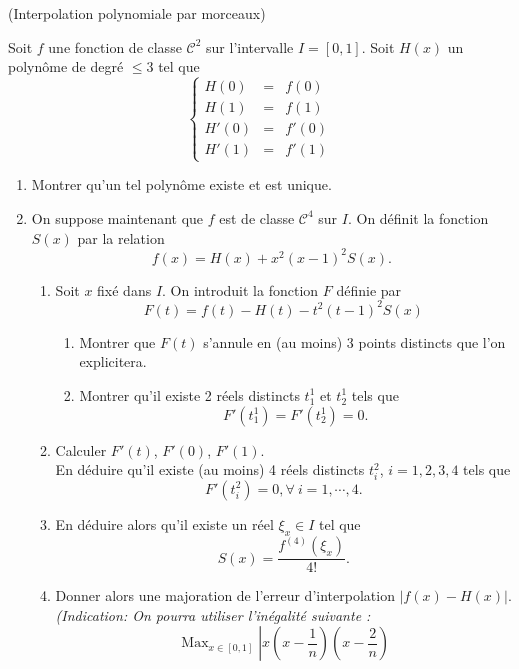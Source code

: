 \documentclass[a4paper,12pt,reqno]{amsart}
\begin{document}
\begin{exo} (Interpolation polynomiale par morceaux)

  Soit $f$ une fonction de classe ${\mathcal{C}}^2$ sur l'intervalle $I=[0,1]$. Soit $H(x)$ un polynôme de degré $\le 3$ tel que
  $$
    \left\{
      \begin{array}{lcl}
        H(0)  &=& f(0)\\
        H(1)  &=& f(1)\\
        H'(0) &=& f'(0)\\
        H'(1) &=& f'(1)
      \end{array}
    \right.
  $$
  \begin{enumerate}
    \item Montrer qu'un tel polynôme existe et est unique.
    \item On suppose maintenant que $f$ est de classe ${\mathcal{C}}^4$ sur $I$. On définit la fonction $S(x)$ par la relation
      $$
        f(x)=H(x)+x^2(x-1)^2S(x).
      $$
    \begin{enumerate}
      \item Soit $x$ fixé dans $I$. On introduit la fonction $F$ définie par
        $$
          F(t)=f(t)-H(t)-t^2(t-1)^2S(x)
        $$
      \begin{enumerate}
        \item Montrer que $F(t)$ s'annule en (au moins) 3 points distincts que l'on explicitera.
        \item Montrer qu'il existe 2 réels distincts $t^1_1$ et $t^1_2$ tels que
          $$
            F'(t^1_1)=F'(t^1_2)=0.
          $$
      \end{enumerate}
      \item Calculer $F'(t)$, $F'(0)$, $F'(1)$.\\
      En déduire qu'il existe (au moins) 4 réels distincts $t^2_i$, $i=1,2,3,4$ tels que
        $$
          F'(t^2_i)=0, \forall  \ i=1, \cdots , 4.
        $$
      \item En déduire alors qu'il existe un réel $\xi_x \in I$ tel que
        $$
          S(x)=\frac{f^{(4)}(\xi_x)}{4!}.
        $$
      \item Donner alors une majoration de l'erreur d'interpolation $|f(x)-H(x)|$.\\
      {\it (Indication: On pourra utiliser l'inégalité suivante :}
      $$
        \operatorname{Max}_{x \in [0,1]}
        \left|{\textstyle
          x\left( x-\frac {1}{n}\right)\left( x-\frac {2}{n}\right)
}$$
\end{enumerate}
\end{enumerate}
\end{exo}
\end{document}
